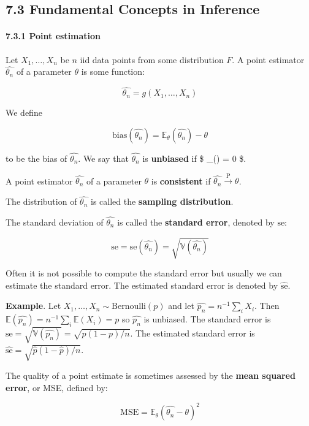 \subsection{7.3 Fundamental Concepts in
Inference}\label{fundamental-concepts-in-inference}

\paragraph{7.3.1 Point estimation}\label{point-estimation}

Let \(X_1, \dots, X_n\) be \(n\) iid data points from some distribution
\(F\). A point estimator \(\hat{\theta_n}\) of a parameter \(\theta\) is
some function:

\[ \hat{\theta_n} = g(X_1, \dots, X_n) \]

We define

\[ \text{bias}(\hat{\theta_n}) = \mathbb{E}_\theta(\hat{\theta_n}) - \theta \]

to be the bias of \(\hat{\theta_n}\). We say that \(\hat{\theta_n}\) is
\textbf{unbiased} if \$ \_\theta() = 0 \$.

A point estimator \(\hat{\theta_n}\) of a parameter \(\theta\) is
\textbf{consistent} if \(\hat{\theta_n} \xrightarrow{\text{P}} \theta\).

The distribution of \(\hat{\theta_n}\) is called the \textbf{sampling
distribution}.

The standard deviation of \(\hat{\theta_n}\) is called the
\textbf{standard error}, denoted by \(\text{se}\):

\[ \text{se} = \text{se}(\hat{\theta_n}) = \sqrt{\mathbb{V}(\hat{\theta_n})} \]

Often it is not possible to compute the standard error but usually we
can estimate the standard error. The estimated standard error is denoted
by \(\hat{\text{se}}\).

\textbf{Example}. Let \(X_1, \dots, X_n \sim \text{Bernoulli}(p)\) and
let \(\hat{p_n} = n^{-1} \sum_i X_i\). Then
\(\mathbb{E}(\hat{p_n}) = n^{-1} \sum_i \mathbb{E}(X_i) = p\) so
\(\hat{p_n}\) is unbiased. The standard error is
\(\text{se} = \sqrt{\mathbb{V}(\hat{p_n})} = \sqrt{p(1-p)/n}\). The
estimated standard error is
\(\hat{\text{se}} = \sqrt{\hat{p}(1 - \hat{p})/n}\).

The quality of a point estimate is sometimes assessed by the
\textbf{mean squared error}, or MSE, defined by:

\[ \text{MSE} = \mathbb{E}_\theta \left( \hat{\theta_n} - \theta \right)^2 \]

